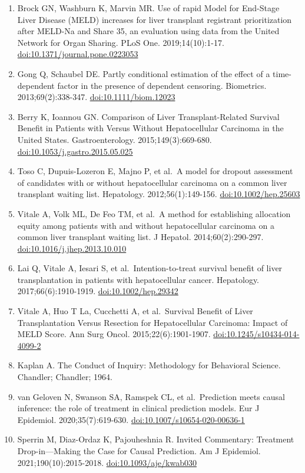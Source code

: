 \documentclass[11pt,english,]{book} %
\begin{document}
\begin{enumerate}
\item
  Brock GN, Washburn K, Marvin MR. Use of rapid Model for End-Stage Liver Disease (MELD) increases for liver transplant registrant prioritization after MELD-Na and Share 35, an evaluation using data from the United Network for Organ Sharing. PLoS One. 2019;14(10):1-17. \url{doi:10.1371/journal.pone.0223053}
\item
  Gong Q, Schaubel DE. Partly conditional estimation of the effect of a time-dependent factor in the presence of dependent censoring. Biometrics. 2013;69(2):338-347. \url{doi:10.1111/biom.12023}
\item
  Berry K, Ioannou GN. Comparison of Liver Transplant-Related Survival Benefit in Patients with Versus Without Hepatocellular Carcinoma in the United States. Gastroenterology. 2015;149(3):669-680. \url{doi:10.1053/j.gastro.2015.05.025}
\item
  Toso C, Dupuis-Lozeron E, Majno P, et al.~A model for dropout assessment of candidates with or without hepatocellular carcinoma on a common liver transplant waiting list. Hepatology. 2012;56(1):149-156. \url{doi:10.1002/hep.25603}
\item
  Vitale A, Volk ML, De Feo TM, et al.~A method for establishing allocation equity among patients with and without hepatocellular carcinoma on a common liver transplant waiting list. J Hepatol. 2014;60(2):290-297. \url{doi:10.1016/j.jhep.2013.10.010}
\item
  Lai Q, Vitale A, Iesari S, et al.~Intention-to-treat survival benefit of liver transplantation in patients with hepatocellular cancer. Hepatology. 2017;66(6):1910-1919. \url{doi:10.1002/hep.29342}
\item
  Vitale A, Huo T La, Cucchetti A, et al.~Survival Benefit of Liver Transplantation Versus Resection for Hepatocellular Carcinoma: Impact of MELD Score. Ann Surg Oncol. 2015;22(6):1901-1907. \url{doi:10.1245/s10434-014-4099-2}
\item
  Kaplan A. The Conduct of Inquiry: Methodology for Behavioral Science. Chandler; Chandler; 1964.
\item
  van Geloven N, Swanson SA, Ramspek CL, et al.~Prediction meets causal inference: the role of treatment in clinical prediction models. Eur J Epidemiol. 2020;35(7):619-630. \url{doi:10.1007/s10654-020-00636-1}
\item
  Sperrin M, Diaz-Ordaz K, Pajouheshnia R. Invited Commentary: Treatment Drop-in---Making the Case for Causal Prediction. Am J Epidemiol. 2021;190(10):2015-2018. \url{doi:10.1093/aje/kwab030}

\end{enumerate}
\end{document}
